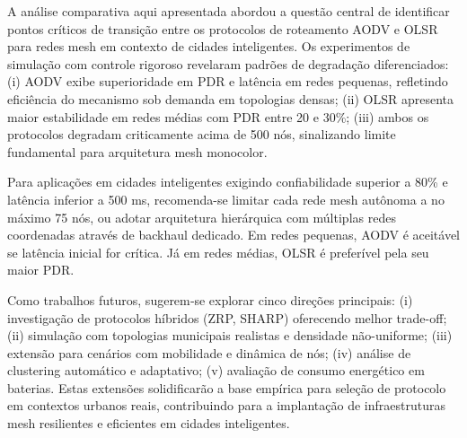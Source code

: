 \documentclass[12pt]{article}
\begin{document}
A análise comparativa aqui apresentada abordou a questão central de identificar pontos críticos de transição entre os protocolos de roteamento AODV e OLSR para redes mesh em contexto de cidades inteligentes. Os experimentos de simulação com controle rigoroso revelaram padrões de degradação diferenciados: (i) AODV exibe superioridade em PDR e latência em redes pequenas, refletindo eficiência do mecanismo sob demanda em topologias densas; (ii) OLSR apresenta maior estabilidade em redes médias com PDR entre 20 e 30\%; (iii) ambos os protocolos degradam criticamente acima de 500 nós, sinalizando limite fundamental para arquitetura mesh monocolor.

Para aplicações em cidades inteligentes exigindo confiabilidade superior a 80\% e latência inferior a 500 ms, recomenda-se limitar cada rede mesh autônoma a no máximo 75 nós, ou adotar arquitetura hierárquica com múltiplas redes coordenadas através de backhaul dedicado. Em redes pequenas, AODV é aceitável se latência inicial for crítica. Já em redes médias, OLSR é preferível pela seu maior PDR.

Como trabalhos futuros, sugerem‑se explorar cinco direções principais: (i) investigação de protocolos híbridos (ZRP, SHARP) oferecendo melhor trade-off; (ii) simulação com topologias municipais realistas e densidade não-uniforme; (iii) extensão para cenários com mobilidade e dinâmica de nós; (iv) análise de clustering automático e adaptativo; (v) avaliação de consumo energético em baterias. Estas extensões solidificarão a base empírica para seleção de protocolo em contextos urbanos reais, contribuindo para a implantação de infraestruturas mesh resilientes e eficientes em cidades inteligentes.








\end{document}

